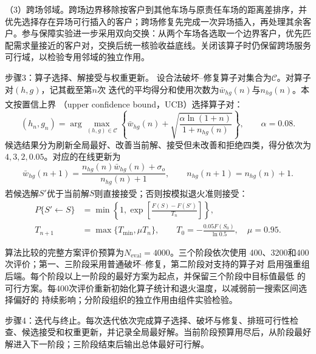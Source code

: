 \documentclass{setp-new}
\begin{document}

（3）跨场邻域。跨场边界移除按客户到其他车场与原责任车场的距离差排序，并优先选择存在异场可行插入的客户；跨场修复先完成一次异场插入，再处理其余客户。参与保障实验进一步采用双向交换：从两个车场各选取一个边界客户，优先匹配需求量接近的客户对，交换后统一核验收益底线。关闭该算子时仍保留跨场服务可行域，以检验专用邻域的独立作用。

\noindent 步骤3：算子选择、解接受与权重更新。
设合法破坏--修复算子对集合为$\mathcal C$。对算子对$(h,g)$，记其截至第$n$次
迭代的平均得分和使用次数为$\bar w_{hg}(n)$与$n_{hg}(n)$。本文按置信上界
（upper confidence bound，UCB）选择算子对\textsuperscript{\cite{ref:68}}：
\begin{equation}
(h_n,g_n)=\arg\max_{(h,g)\in\mathcal C}
\left\{\bar w_{hg}(n)+
\sqrt{\frac{\alpha\ln(1+n)}{1+n_{hg}(n)}}\right\},\qquad \alpha=0.08.
\label{eq:ucb-selection}
\end{equation}
候选结果分为刷新全局最好、改善当前解、接受但未改善和拒绝四类，得分依次为
$4,3,2,0.05$。对应的在线更新为
\begin{equation}
\bar w_{hg}(n+1)=
\frac{n_{hg}(n)\bar w_{hg}(n)+\sigma_o}{n_{hg}(n)+1},\qquad
n_{hg}(n+1)=n_{hg}(n)+1.
\label{eq:ucb-update}
\end{equation}
若候选解$S'$优于当前解$S$则直接接受；否则按模拟退火准则接受\textsuperscript{\cite{ref:69}}：
\begin{equation}
\begin{aligned}
P\{S'\leftarrow S\}&=\min\left\{1,
\exp\left[\frac{F(S)-F(S')}{T_n}\right]\right\},\\
T_{n+1}&=\max\{T_{\min},\mu T_n\},\qquad
T_0=-\frac{0.05F(S_0)}{\ln0.5},\quad \mu=0.95.
\end{aligned}
\label{eq:sa-acceptance}
\end{equation}

算法比较的完整方案评价预算为$N_{\mathrm{eval}}=4000$。三个阶段依次使用
400、3200和400次评价；第一、三阶段采用普通破坏--修复，第二阶段对支持的算子对
启用强重组后端。每个阶段以上一阶段的最好方案为起点，并保留三个阶段中目标值最低
的可行方案。每400次评价重新初始化算子统计和退火温度，以减弱前一搜索区间选择偏好的
持续影响；分阶段组织的独立作用由组件实验检验。

\noindent 步骤4：迭代与终止。每次迭代依次完成算子选择、破坏与修复、排班可行性检查、候选接受和权重更新，并记录全局最好解。当前阶段预算用尽后，从阶段最好解进入下一阶段；三阶段结束后输出总体最好可行解。
\end{document}
